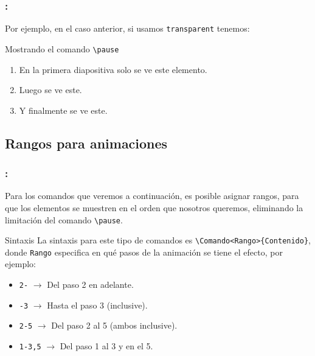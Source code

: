 \documentclass[11pt]{beamer}	%
\begin{document}
\begin{frame}
	\frametitle{\secname : \subsecname}
	
	Por ejemplo, en el caso anterior, si usamos \texttt{transparent} tenemos:
		
	\begin{block}{Mostrando el comando \texttt{\textbackslash pause}}
	\begin{enumerate}
		\item En la primera diapositiva solo se ve este elemento.	\pause
		\item Luego se ve este.							\pause
		\item Y finalmente se ve este.						
	\end{enumerate}
	\end{block}
\end{frame}
	
\subsection{Rangos para animaciones}
\begin{frame}
	\frametitle{\secname : \subsecname}
	
	Para los comandos que veremos a continuación, es posible asignar rangos, para que los elementos se muestren en el orden que nosotros queremos, eliminando la limitación del comando \texttt{\textbackslash pause}.\vfill
	
	\begin{block}{Sintaxis}
		La sintaxis para este tipo de comandos es \texttt{\textbackslash Comando<Rango>\{Contenido\}},  donde \texttt{Rango} especifica en qué pasos de la animación se tiene el efecto, por ejemplo:
			\begin{itemize}
				\item \texttt{2-} $\rightarrow$ Del paso 2 en adelante.
				\item \texttt{-3} $\rightarrow$ Hasta el paso 3 (inclusive).
				\item \texttt{2-5} $\rightarrow$ Del paso 2 al 5 (ambos inclusive).
				\item \texttt{1-3,5} $\rightarrow$ Del paso 1 al 3 y en el 5.
			\end{itemize}
	\end{block}
\end{frame}

\end{document}
